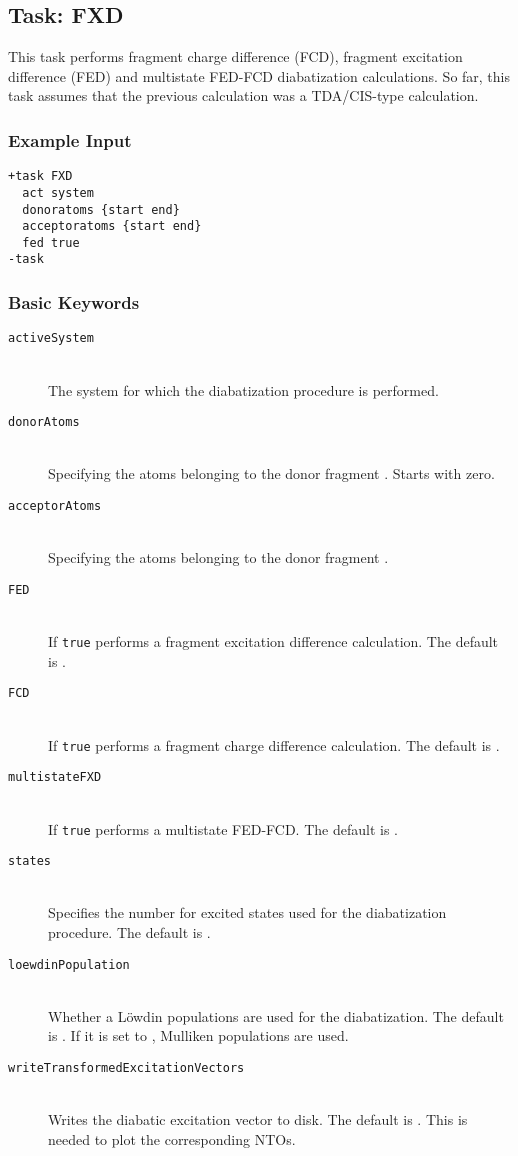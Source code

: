 \subsection{Task: FXD}
\label{sec:FXD}
This task performs fragment charge difference (FCD), fragment excitation difference (FED) and multistate FED-FCD diabatization calculations.
So far, this task assumes that the previous calculation was a TDA/CIS-type calculation. 
\subsubsection{Example Input}
\begin{lstlisting}
+task FXD
  act system
  donoratoms {start end}
  acceptoratoms {start end}
  fed true
-task
\end{lstlisting}
\subsubsection{Basic Keywords}
\begin{description}
	\item [\texttt{activeSystem}]\hfill \\
	The system for which the diabatization procedure is performed.
	\item [\texttt{donorAtoms}]\hfill \\
	Specifying the atoms belonging to the donor fragment . Starts with zero. 
	\item [\texttt{acceptorAtoms}]\hfill \\
	Specifying the atoms belonging to the donor fragment . 
	\item [\texttt{FED}]\hfill \\
	If \texttt{true} performs a fragment excitation difference calculation. The default is .
	\item [\texttt{FCD}]\hfill \\
	If \texttt{true} performs a fragment charge difference calculation. The default is .
	\item [\texttt{multistateFXD}]\hfill \\
	If \texttt{true} performs a multistate FED-FCD. The default is .
	\item [\texttt{states}]\hfill \\
  Specifies the number for excited states used for the diabatization procedure. The default is .
	\item [\texttt{loewdinPopulation}]\hfill \\
	Whether a Löwdin populations are used for the diabatization. The default is . If it is set to , Mulliken populations are used.
	\item [\texttt{writeTransformedExcitationVectors}]\hfill \\
	Writes the diabatic excitation vector to disk. The default is . This is needed to plot the corresponding NTOs.
\end{description}
